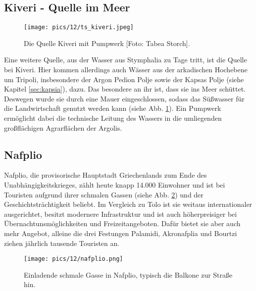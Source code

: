 \documentclass[preprint]{geomorphica} %
\begin{document}
\subsection{Kiveri - Quelle im Meer}

\begin{figure}[h]
    \centering
    \texttt{[image: pics/12/ts\_kiveri.jpeg]}
    \caption{Die Quelle Kiveri mit Pumpwerk [Foto: Tabea Storch].}
    \label{pic:kiveri}
\end{figure}

Eine weitere Quelle, aus der Wasser aus Stymphalia zu Tage tritt, ist die Quelle bei Kiveri. Hier kommen allerdings auch Wässer aus der arkadischen Hochebene um Tripoli, insbesondere der Argon Pedion Polje sowie der Kapsas Polje (siehe Kapitel \ref{sec:kapsia}), dazu. Das besondere an ihr ist, dass sie ins Meer schüttet. Deswegen wurde sie durch eine Mauer eingeschlossen, sodass das Süßwasser für die Landwirtschaft genutzt werden kann (siehe Abb. \ref{pic:kiveri}). Ein Pumpwerk ermöglicht dabei die technische Leitung des Wassers in die umliegenden großflächigen Agrarflächen der Argolis.

\newpage

\subsection{Nafplio}

Nafplio, die provisorische Hauptstadt Griechenlands zum Ende des Unabhängigkeitskrieges, zählt heute knapp 14.000 Einwohner und ist bei Touristen aufgrund ihrer schmalen Gassen (siehe Abb. \ref{pic:nafplio}) und der Geschichtsträchtigkeit beliebt. Im Vergleich zu Tolo ist sie weitaus internationaler ausgerichtet, besitzt modernere Infrastruktur und ist auch höherpreisiger bei Übernachtunsmöglichkeiten und Freizeitangeboten. Dafür bietet sie aber auch mehr Angebot, alleine die drei Festungen Palamidi, Akronafplia und Bourtzi ziehen jährlich tausende Touristen an.

\vspace*{\fill}

\begin{figure}[h]
    \centering
    \texttt{[image: pics/12/nafplio.png]}
    \caption{Einladende schmale Gasse in Nafplio, typisch die Balkone zur Straße hin.}
    \label{pic:nafplio}
\end{figure}


\newpage
\end{document}
